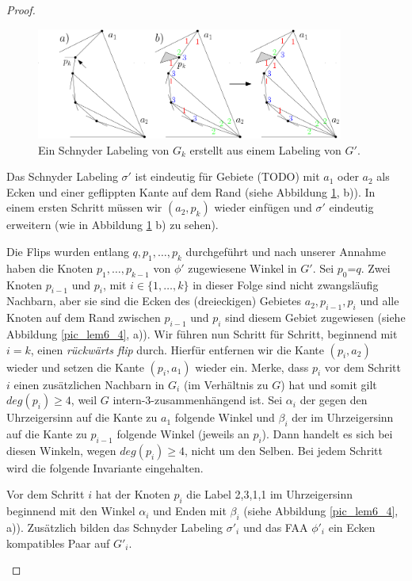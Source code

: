 \begin{proof}
\begin{figure}
	\centering
	  \includegraphics[width=0.9\textwidth]{lem6_3.png}
    	\caption{Ein Schnyder Labeling von $G_k$ erstellt aus einem Labeling von $G'$. }
    	\label{pic_lem6_3}
\end{figure}

Das Schnyder Labeling $\sigma'$ ist eindeutig für Gebiete (TODO) mit $a_1$ oder $a_2$ als Ecken und einer geflippten Kante auf dem Rand (siehe Abbildung \ref{pic_lem6_3}, b)). In einem ersten Schritt müssen wir $(a_2,p_k)$ wieder einfügen und $\sigma'$ eindeutig erweitern (wie in Abbildung \ref{pic_lem6_3} b) zu sehen).

Die Flips wurden entlang $q,p_1,\ldots,p_k$ durchgeführt und nach unserer Annahme haben die Knoten $p_1,\ldots,p_{k-1}$ von $\phi'$ zugewiesene Winkel in $G'$. Sei $p_0$=$q$. Zwei Knoten $p_{i-1}$ und $p_i$, mit $i \in \{1,\ldots,k\}$ in dieser Folge sind nicht zwangsläufig Nachbarn, aber sie sind die Ecken des (dreieckigen) Gebietes $a_2,p_{i-1},p_{i}$ und alle Knoten auf dem Rand zwischen $p_{i-1}$ und $p_{i}$ sind diesem Gebiet zugewiesen (siehe Abbildung \ref{pic_lem6_4}, a)). Wir führen nun Schritt für Schritt, beginnend mit $i=k$, einen \textit{rückwärts flip} durch. Hierfür entfernen wir die Kante $(p_{i},a_2)$ wieder und setzen die Kante $(p_{i},a_1)$ wieder ein. Merke, dass $p_{i}$ vor dem Schritt $i$ einen zusätzlichen Nachbarn in $G_{i}$ (im Verhältnis zu $G$) hat und somit gilt $deg(p_{i}) \geq 4$, weil $G$ intern-3-zusammenhängend ist. Sei $\alpha_{i}$ der gegen den Uhrzeigersinn auf die Kante zu $a_1$ folgende Winkel und $\beta_{i}$ der im Uhrzeigersinn auf die Kante zu $p_{i-1}$ folgende Winkel (jeweils an $p_{i}$). Dann handelt es sich bei diesen Winkeln, wegen $deg(p_i) \geq 4$, nicht um den Selben. Bei jedem Schritt wird die folgende Invariante eingehalten.

\begin{invariant}
Vor dem Schritt $i$ hat der Knoten $p_i$ die Label 2,3,1,1 im Uhrzeigersinn beginnend mit den Winkel $\alpha_i$ und Enden mit $\beta_i$ (siehe Abbildung \ref{pic_lem6_4}, a)). Zusätzlich bilden das Schnyder Labeling $\sigma'_i$ und das FAA $\phi'_i$ ein Ecken kompatibles Paar auf $G'_i$.
\end{invariant}


\end{proof}
